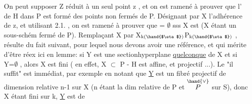 On peut supposer Z réduit à un seul point z , et on est ramené à
prouver que l' de H dans P est formé  des points non fermés de P.
Désignant par X l'adhérence de z, et utilisant 2.1. , on est ramené à
prouver que \hand{$_\eta$} = $\emptyset$ sss X est   (X étant un sous-schém%
fermé  de P). Remplaçant X par X$_{\text{k(\hand{$\eta$})}}$\hand{$\hookrightarrow$}P$_{\text{k(\hand{$\eta$})}}$ ,   résulte du fait
suivant, pour lequel nous devons avoir une référence, et qui mérite d'être
réex ici en lemme: si Y est une sectionhyperplane \uline{quelconque} de
X et si Y\hand{\unsure{$_\eta$}}=$\emptyset$ , alors X est fini ( en effet, X $\subset$ P - H est affine, et
projectif ...). Le "il suffit" est immédiat, par exemple en notant que
\uline{Y} est un fibré projectif de dimension relative n-1 sur X (n étant la
dim relative de P  et $\overset{\hand{\vee}}{P}$ sur S), donc X étant fini sur k, \uline{Y} est de

